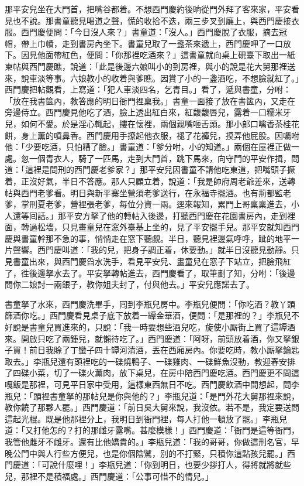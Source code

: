 那平安兒坐在大門首，把嘴谷都着。不想西門慶約後晌從門外拜了客來家，平安看見也不說。那書童聽見喝道之聲，慌的收拾不迭，兩三步叉到廳上，與西門慶接衣服。西門慶便問：「今日沒人來？」書童道：「沒人。」西門慶脫了衣服，摘去冠帽，帶上巾幘，走到書房內坐下。書童兒取了一盞茶來遞上，西門慶呷了一口放下。因見他面帶紅色，便問：「你那裡吃酒來？」這書童就向桌上硯臺下取出一紙柬帖與西門慶瞧，說道：「此是後邊六娘叫小的到房裡，與小的說是花大舅那裡送來，說車淡等事。六娘教小的收着與爹瞧。因賞了小的一盞酒吃，不想臉就紅了。」西門慶把帖觀看，上寫道：「犯人車淡四名，乞青目。」看了，遞與書童，分咐：「放在我書篋內，教答應的明日衙門裡稟我。」書童一面接了放在書篋內，又走在旁邊侍立。西門慶見他吃了酒，臉上透出紅白來，紅馥馥唇兒，露着一口糯米牙兒，如何不愛。於是淫心輒起，摟在懷裡，兩個親嘴咂舌頭。那小郎口噙香茶桂花餅，身上薰的噴鼻香。西門慶用手撩起他衣服，褪了花褲兒，摸弄他屁股。因囑咐他：「少要吃酒，只怕糟了臉。」書童道：「爹分咐，小的知道。」兩個在屋裡正做一處。忽一個青衣人，騎了一匹馬，走到大門首，跳下馬來，向守門的平安作揖，問道：「這裡是問刑的西門慶老爹家？」那平安兒因書童不請他吃東道，把嘴頭子撅着，正沒好氣，半日不答應。那人只顧立着，說道：「我是帥府周老爺差來，送轉帖與西門老爹看。明日與新平寨坐營須老爹送行，在永福寺擺酒。也有荊都監老爹，掌刑夏老爹，營裡張老爹，每位分資一兩。逕來報知，累門上哥稟稟進去，小人還等囘話。」那平安方拏了他的轉帖入後邊，打聽西門慶在花園書房內，走到裡面，轉過松墻，只見畫童兒在窓外臺基上坐的，見了平安擺手兒。那平安就知西門慶與書童幹那不急的事，悄悄走在窓下聽覷。半日，聽見裡邊氣呼呼，跐的地平一片聲響。西門慶叫道：「我的兒，把身子調正着，休要動。」就半日沒聽見動靜。{}只見書童出來，與西門慶舀水洗手，看見平安兒、畫童兒在窓子下站立，把臉飛紅了，徃後邊拏水去了。平安拏轉帖進去，西門慶看了，取筆劃了知，分咐：「後邊問你二娘討一兩銀子，教你姐夫封了，付與他去。」平安兒應諾去了。

書童拏了水來，西門慶洗畢手，囘到李瓶兒房中。李瓶兒便問：「你吃酒？教丫頭篩酒你吃。」西門慶看見桌子底下放着一罈金華酒，便問：「是那裡的？」李瓶兒不好說是書童兒買進來的，只說：「我一時要想些酒兒吃，旋使小厮街上買了這罈酒來。開啟只吃了兩鍾兒，就懶待吃了。」西門慶道：「阿呀，前頭放着酒，你又拏銀子買！前日我賒了丁蠻子四十罈河清酒，丟在西廂房內。你要吃時，教小厮拏鑰匙取去。」李瓶兒還有頭裡吃的一碟燒鴨子、一碟雞肉、一碟鮮魚沒動，教迎春安排了四碟小菜，切了一碟火薰肉，放下桌兒，在房中陪西門慶吃酒。西門慶更不問這嘎飯是那裡，可見平日家中受用，這樣東西無日不吃。西門慶飲酒中間想起，問李瓶兒：「頭裡書童拏的那帖兒是你與他的？」李瓶兒道：「是門外花大舅那裡來說，教你饒了那夥人罷。」西門慶道：「前日吳大舅來說，我沒依。若不是，我定要送問這起光棍。既是他那裡分上，我明日到衙門裡，每人打他一頓放了罷。」李瓶兒道：「又打他怎的？打的那雌牙露嘴。甚麼模樣！」西門慶道：「衙門是這等衙門，我管他雌牙不雌牙。還有比他嬌貴的。」李瓶兒道：「我的哥哥，你做這刑名官，早晚公門中與人行些方便兒，也是你個陰騭，別的不打緊，只積你這點孩兒罷。」西門慶道：「可說什麼哩！」李瓶兒道：「你到明日，也要少拶打人，得將就將就些兒，那裡不是積福處。」西門慶道：「公事可惜不的情兒。」

